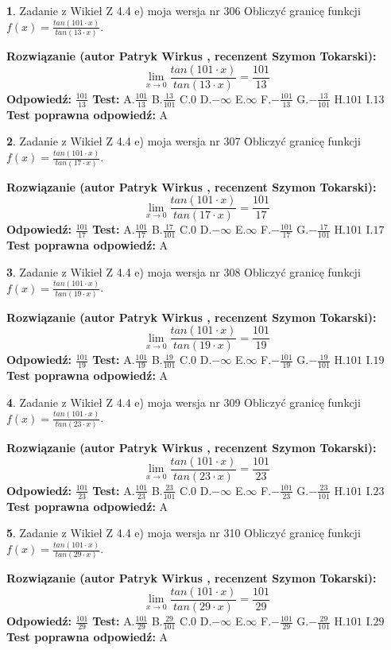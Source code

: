 \documentclass[12pt, a4paper]{article}
\theoremstyle{definition} %
\newtheorem{zad}{}
\newcommand{\zadStart}[1]{\begin{zad}#1\newline}
\newcommand{\zadStop}{\end{zad}}
\newcommand{\rozwStart}[2]{\noindent \textbf{Rozwiązanie (autor #1 , recenzent #2): }\newline}
\newcommand{\rozwStop}{\newline}
\newcommand{\odpStart}{\noindent \textbf{Odpowiedź:}\newline}
\newcommand{\odpStop}{\newline}
\newcommand{\testStart}{\noindent \textbf{Test:}\newline}
\newcommand{\testStop}{\newline}
\newcommand{\kluczStart}{\noindent \textbf{Test poprawna odpowiedź:}\newline}
\newcommand{\kluczStop}{\newline}
\begin{document}
\zadStart{Zadanie z Wikieł Z 4.4 e) moja wersja nr 306}
Obliczyć granicę funkcji $f(x)=\frac{tan(101\cdot x)}{tan(13\cdot x)}$.
\zadStop
\rozwStart{Patryk Wirkus}{Szymon Tokarski}
$$\lim\limits_{x\to 0}\frac{tan(101\cdot x)}{tan(13\cdot x)}=
\frac{101}{13}$$
\rozwStop
\odpStart
$\frac{101}{13}$
\odpStop
\testStart
A.$\frac{101}{13}$
B.$\frac{13}{101}$
C.$0$
D.$-\infty$
E.$\infty$
F.$-\frac{101}{13}$
G.$-\frac{13}{101}$
H.$101$
I.$13$
\testStop
\kluczStart
A
\kluczStop



\zadStart{Zadanie z Wikieł Z 4.4 e) moja wersja nr 307}
Obliczyć granicę funkcji $f(x)=\frac{tan(101\cdot x)}{tan(17\cdot x)}$.
\zadStop
\rozwStart{Patryk Wirkus}{Szymon Tokarski}
$$\lim\limits_{x\to 0}\frac{tan(101\cdot x)}{tan(17\cdot x)}=
\frac{101}{17}$$
\rozwStop
\odpStart
$\frac{101}{17}$
\odpStop
\testStart
A.$\frac{101}{17}$
B.$\frac{17}{101}$
C.$0$
D.$-\infty$
E.$\infty$
F.$-\frac{101}{17}$
G.$-\frac{17}{101}$
H.$101$
I.$17$
\testStop
\kluczStart
A
\kluczStop



\zadStart{Zadanie z Wikieł Z 4.4 e) moja wersja nr 308}
Obliczyć granicę funkcji $f(x)=\frac{tan(101\cdot x)}{tan(19\cdot x)}$.
\zadStop
\rozwStart{Patryk Wirkus}{Szymon Tokarski}
$$\lim\limits_{x\to 0}\frac{tan(101\cdot x)}{tan(19\cdot x)}=
\frac{101}{19}$$
\rozwStop
\odpStart
$\frac{101}{19}$
\odpStop
\testStart
A.$\frac{101}{19}$
B.$\frac{19}{101}$
C.$0$
D.$-\infty$
E.$\infty$
F.$-\frac{101}{19}$
G.$-\frac{19}{101}$
H.$101$
I.$19$
\testStop
\kluczStart
A
\kluczStop



\zadStart{Zadanie z Wikieł Z 4.4 e) moja wersja nr 309}
Obliczyć granicę funkcji $f(x)=\frac{tan(101\cdot x)}{tan(23\cdot x)}$.
\zadStop
\rozwStart{Patryk Wirkus}{Szymon Tokarski}
$$\lim\limits_{x\to 0}\frac{tan(101\cdot x)}{tan(23\cdot x)}=
\frac{101}{23}$$
\rozwStop
\odpStart
$\frac{101}{23}$
\odpStop
\testStart
A.$\frac{101}{23}$
B.$\frac{23}{101}$
C.$0$
D.$-\infty$
E.$\infty$
F.$-\frac{101}{23}$
G.$-\frac{23}{101}$
H.$101$
I.$23$
\testStop
\kluczStart
A
\kluczStop



\zadStart{Zadanie z Wikieł Z 4.4 e) moja wersja nr 310}
Obliczyć granicę funkcji $f(x)=\frac{tan(101\cdot x)}{tan(29\cdot x)}$.
\zadStop
\rozwStart{Patryk Wirkus}{Szymon Tokarski}
$$\lim\limits_{x\to 0}\frac{tan(101\cdot x)}{tan(29\cdot x)}=
\frac{101}{29}$$
\rozwStop
\odpStart
$\frac{101}{29}$
\odpStop
\testStart
A.$\frac{101}{29}$
B.$\frac{29}{101}$
C.$0$
D.$-\infty$
E.$\infty$
F.$-\frac{101}{29}$
G.$-\frac{29}{101}$
H.$101$
I.$29$
\testStop
\kluczStart
A
\kluczStop
\end{document}

